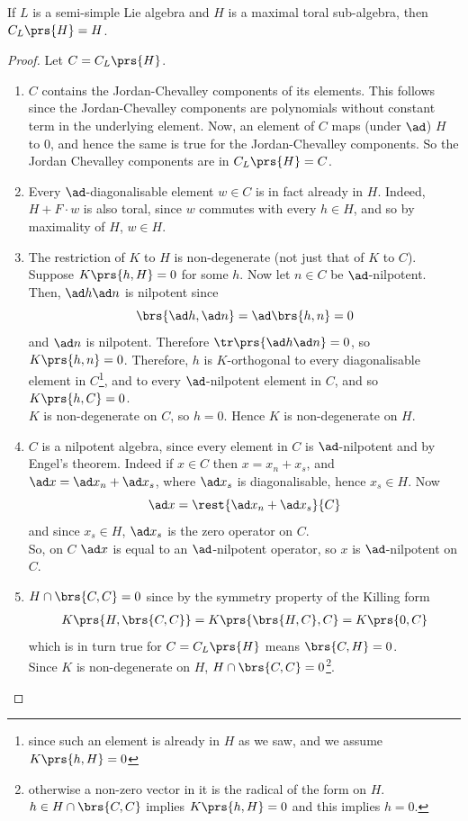 \documentclass[10pt,a4paper,twoside,openany,hidelinks]{book}
\begin{document}
\begin{theorem}
If $L$ is a semi-simple Lie algebra and $H$ is a maximal toral sub-algebra, then $C_L\prs{H} = H$.
\end{theorem}
\begin{proof}
Let $C = C_L\prs{H}$.
\begin{enumerate}[label = Step \arabic*.]
\item $C$ contains the Jordan-Chevalley components of its elements.
This follows since the Jordan-Chevalley components are polynomials without constant term in the underlying element. Now, an element of $C$ maps (under $\ad$) $H$ to $0$, and hence the same is true for the Jordan-Chevalley components.
So the Jordan Chevalley components are in $C_L\prs{H} = C$.

\item Every $\ad$-diagonalisable element $w \in C$ is in fact already in $H$. Indeed, $H+F\cdot w$ is also toral, since $w$ commutes with every $h \in H$, and so by maximality of $H$, $w \in H$.

\item The restriction of $K$ to $H$ is non-degenerate (not just that of $K$ to $C$).
Suppose $K\prs{h,H} = 0$ for some $h$. Now let $n \in C$ be $\ad$-nilpotent. Then, $\ad h \ad n$ is nilpotent since \[\brs{\ad h, \ad n} = \ad \brs{h,n} = 0\] and $\ad n$ is nilpotent. Therefore $\tr\prs{\ad h \ad n} = 0$, so $K\prs{h,n} = 0$. Therefore, $h$ is $K$-orthogonal to every diagonalisable element in $C$\footnote{since such an element is already in $H$ as we saw, and we assume $K\prs{h,H} = 0$}, and to every $\ad$-nilpotent element in $C$, and so $K\prs{h,C} = 0$.\\
$K$ is non-degenerate on $C$, so $h = 0$. Hence $K$ is non-degenerate on $H$.

\item $C$ is a nilpotent algebra, since every element in $C$ is $\ad$-nilpotent and by Engel's theorem. Indeed if $x \in C$ then $x = x_n + x_s$, and $\ad x = \ad x_n + \ad x_s$, where $\ad x_s$ is diagonalisable, hence $x_s \in H$. Now
\[\ad x = \rest{\ad x_n + \ad x_s}{C}\]
and since $x_s \in H$, $\ad x_s$ is the zero operator on $C$.\\
So, on $C$ $\ad x$ is equal to an $\ad$-nilpotent operator, so $x$ is $\ad$-nilpotent on $C$.

\item $H \cap \brs{C,C} = 0$ since by the symmetry property of the Killing form
\begin{align*}
K\prs{H,\brs{C,C}} = K\prs{\brs{H,C},C} = K\prs{0,C}
\end{align*}
which is in turn true for $C = C_L\prs{H}$ means $\brs{C,H} = 0$. \\
Since $K$ is non-degenerate on $H$, $H \cap \brs{C,C} = 0$\footnote{otherwise a non-zero vector in it is the radical of the form on $H$. $h \in H \cap \brs{C,C}$ implies $K\prs{h,H} = 0$ and this implies $h = 0$.}.


\end{enumerate}
\end{proof}
\end{document}
